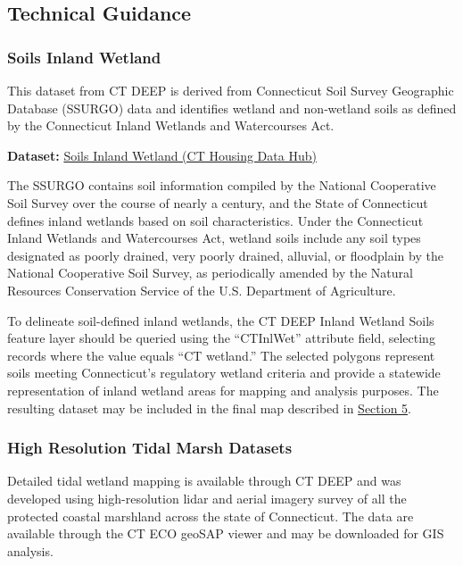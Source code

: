 \documentclass[
  letterpaper,
  DIV=11,
  numbers=noendperiod]{scrreprt}
\begin{document}
\subsection{Technical Guidance}\label{technical-guidance-2}

\subsubsection{Soils Inland Wetland}\label{sec-soils-inland-wetland}

This dataset from CT DEEP is derived from Connecticut Soil Survey
Geographic Database (SSURGO) data and identifies wetland and non‑wetland
soils as defined by the Connecticut Inland Wetlands and Watercourses
Act.

\textbf{Dataset:}
\href{https://housingmaps.ct.gov/datasets/CTDEEP::soils-inland-wetland/about}{Soils
Inland Wetland (CT Housing Data Hub)}

The SSURGO contains soil information compiled by the National
Cooperative Soil Survey over the course of nearly a century, and the
State of Connecticut defines inland wetlands based on soil
characteristics. Under the Connecticut Inland Wetlands and Watercourses
Act, wetland soils include any soil types designated as poorly drained,
very poorly drained, alluvial, or floodplain by the National Cooperative
Soil Survey, as periodically amended by the Natural Resources
Conservation Service of the U.S. Department of Agriculture.

To delineate soil-defined inland wetlands, the CT DEEP Inland Wetland
Soils feature layer should be queried using the ``CTInlWet'' attribute
field, selecting records where the value equals ``CT wetland.'' The
selected polygons represent soils meeting Connecticut's regulatory
wetland criteria and provide a statewide representation of inland
wetland areas for mapping and analysis purposes. The resulting dataset
may be included in the final map described in \href{map.qmd}{Section 5}.

\subsubsection{High Resolution Tidal Marsh
Datasets}\label{sec-high-resolution-tidal-marsh-datasets}

Detailed tidal wetland mapping is available through CT DEEP and was
developed using high-resolution lidar and aerial imagery survey of all
the protected coastal marshland across the state of Connecticut. The
data are available through the CT ECO geoSAP viewer and may be
downloaded for GIS analysis.
\end{document}
